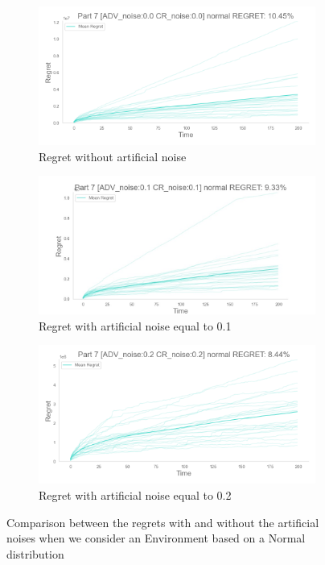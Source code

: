 \begin{figure}[!htb]
    \centering

    \begin{subfigure}[!H]{0.8\textwidth}
        \centering
        \includegraphics[width=\textwidth]{images/part7_normal_regret_noise00.png}
        \caption{Regret without artificial noise}
    \end{subfigure}

    \begin{subfigure}[!H]{0.8\textwidth}
        \centering
        \includegraphics[width=\textwidth]{images/part7_normal_regret_noise01.jpeg}
        \caption{Regret with artificial noise equal to 0.1}
    \end{subfigure}

    \begin{subfigure}[!H]{0.8\textwidth}
        \centering
        \includegraphics[width=\textwidth]{images/part7_normal_regret_noise02.png}
        \caption{Regret with artificial noise equal to 0.2}
    \end{subfigure}

    \caption{Comparison between the regrets with and without the artificial noises when we consider an Environment based on a Normal distribution}
    \label{fig:RegretsPart7Normal}
\end{figure}